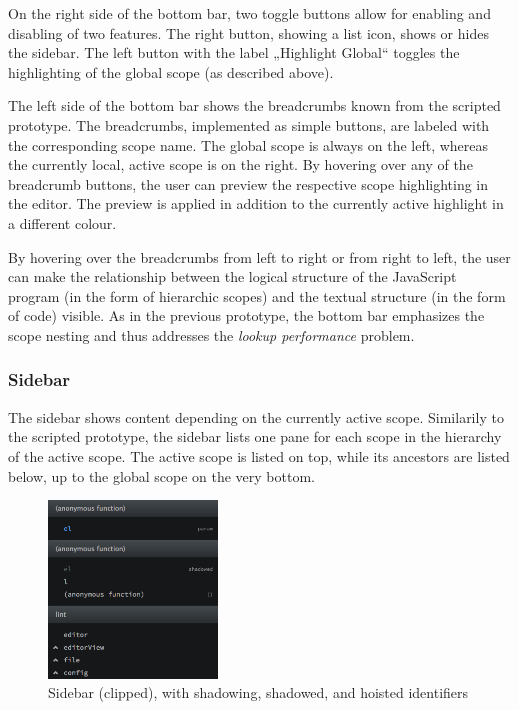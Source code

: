 On the right side of the bottom bar, two toggle buttons allow for
enabling and disabling of two features. The right button, showing a list
icon, shows or hides the sidebar. The left button with the label
„Highlight Global“ toggles the highlighting of the global scope (as
described above).

The left side of the bottom bar shows the breadcrumbs known from the
scripted prototype. The breadcrumbs, implemented as simple buttons, are
labeled with the corresponding scope name. The global scope is always on
the left, whereas the currently local, active scope is on the right. By
hovering over any of the breadcrumb buttons, the user can preview the
respective scope highlighting in the editor. The preview is applied in
addition to the currently active highlight in a different colour.

By hovering over the breadcrumbs from left to right or from right to
left, the user can make the relationship between the logical structure
of the JavaScript program (in the form of hierarchic scopes) and the
textual structure (in the form of code) visible. As in the previous
prototype, the bottom bar emphasizes the scope nesting and thus
addresses the \emph{lookup performance} problem.

\subsubsection{Sidebar}\label{sidebar}

The sidebar shows content depending on the currently active scope.
Similarily to the scripted prototype, the sidebar lists one pane for
each scope in the hierarchy of the active scope. The active scope is
listed on top, while its ancestors are listed below, up to the global
scope on the very bottom.

\begin{figure}[H]
\centering
\includegraphics[keepaspectratio,width=0.4\textwidth]{img/sidebar.png}
\caption{Sidebar (clipped), with shadowing, shadowed, and hoisted identifiers}
\label{fig:protosidebar}
\end{figure}


